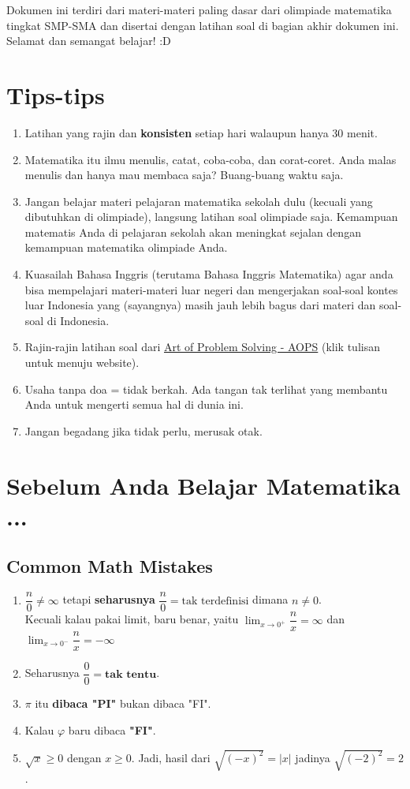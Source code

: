 Dokumen ini terdiri dari materi-materi paling dasar dari olimpiade matematika tingkat SMP-SMA dan disertai dengan latihan soal di bagian akhir dokumen ini. Selamat dan semangat belajar! :D
	\section{Tips-tips}
	\begin{enumerate}
	    \item Latihan yang rajin dan \textbf{konsisten} setiap hari walaupun hanya 30 menit.
	    \item Matematika itu ilmu menulis, catat, coba-coba, dan corat-coret. Anda malas menulis dan hanya mau membaca saja? Buang-buang waktu saja.
	    \item Jangan belajar materi pelajaran matematika sekolah dulu (kecuali yang dibutuhkan di olimpiade), langsung latihan soal olimpiade saja. Kemampuan matematis Anda di pelajaran sekolah akan meningkat sejalan dengan kemampuan matematika olimpiade Anda.
	    \item Kuasailah Bahasa Inggris (terutama Bahasa Inggris Matematika) agar anda bisa mempelajari materi-materi luar negeri dan mengerjakan soal-soal kontes luar Indonesia yang (sayangnya) masih jauh lebih bagus dari materi dan soal-soal di Indonesia.
	    \item Rajin-rajin latihan soal dari \href{https://artofproblemsolving.com/community}{Art of Problem Solving - AOPS} (klik tulisan untuk menuju website).
	    \item Usaha tanpa doa = tidak berkah. Ada tangan tak terlihat yang membantu Anda untuk mengerti semua hal di dunia ini.
	    \item Jangan begadang jika tidak perlu, merusak otak.

	\end{enumerate}
	
	\section{Sebelum Anda Belajar Matematika ...}
	\subsection{Common Math Mistakes}
	\begin{enumerate}
	    \item $\dfrac{n}{0} \neq \infty$ tetapi \textbf{seharusnya} $\dfrac{n}{0} = \text{tak terdefinisi}$ dimana $n \neq 0$.\\
	    Kecuali kalau pakai limit, baru benar, yaitu $\lim_{x \rightarrow 0^+} \dfrac{n}{x} = \infty$ dan $\lim_{x \rightarrow 0^-} \dfrac{n}{x} = -\infty$
	    \item Seharusnya $\dfrac{0}{0} = \textbf{tak tentu}$.
	    \item $\pi$ itu \textbf{dibaca "PI"} bukan dibaca "FI". 
	    \item Kalau $\varphi$ baru dibaca \textbf{"FI"}.
	    \item $\sqrt{x} \ge 0$ dengan $x \ge 0$. Jadi, hasil dari $\sqrt{(-x)^2}=|x|$ jadinya $\sqrt{(-2)^2}=2$.
	\end{enumerate}
